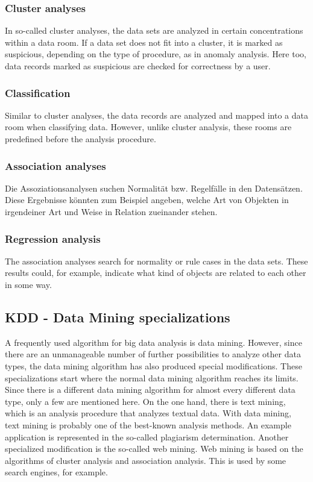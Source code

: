 \documentclass[12pt,twocolumn,twoside]{conference}   %
\begin{document}
\subsubsection{Cluster analyses}
In so-called cluster analyses, the data sets are analyzed in certain concentrations within a data room. If a data set does not fit into a cluster, it is marked as suspicious, depending on the type of procedure, as in anomaly analysis. Here too, data records marked as suspicious are checked for correctness by a user.

\subsubsection{Classification}
Similar to cluster analyses, the data records are analyzed and mapped into a data room when classifying data. However, unlike cluster analysis, these rooms are predefined before the analysis procedure. 

\subsubsection{Association analyses}
Die Assoziationsanalysen suchen Normalität bzw. Regelfälle in den Datensätzen. Diese Ergebnisse könnten zum Beispiel angeben, welche Art von Objekten in irgendeiner Art und Weise in Relation zueinander stehen. 

\subsubsection{Regression analysis}
The association analyses search for normality or rule cases in the data sets. These results could, for example, indicate what kind of objects are related to each other in some way. 

\subsection{KDD - Data Mining specializations}
A frequently used algorithm for big data analysis is data mining. However, since there are an unmanageable number of further possibilities to analyze other data types, the data mining algorithm has also produced special modifications. These specializations start where the normal data mining algorithm reaches its limits. Since there is a different data mining algorithm for almost every different data type, only a few are mentioned here. On the one hand, there is text mining, which is an analysis procedure that analyzes textual data. With data mining, text mining is probably one of the best-known analysis methods. An example application is represented in the so-called plagiarism determination. Another specialized modification is the so-called web mining. Web mining is based on the algorithms of cluster analysis and association analysis. This is used by some search engines, for example. 
\end{document}
